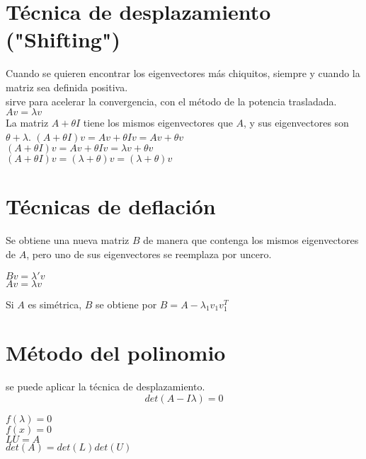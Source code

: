 \section{T\'ecnica de desplazamiento ("Shifting")}
Cuando se quieren encontrar los eigenvectores m\'as chiquitos, siempre y cuando la matriz sea definida positiva.\\
sirve para acelerar la convergencia, con el m\'etodo de la potencia trasladada.\\ 
$Av=\lambda v$\\
La matriz $A+\theta I$ tiene los mismos eigenvectores que $A$, y sus eigenvectores son $\theta +\lambda$.
$(A+\theta I)v=Av+\theta Iv=Av+\theta v$
\\
$(A+\theta I)v=Av+\theta Iv=\lambda v+\theta v$\\
$(A+\theta I)v=(\lambda+\theta)v=(\lambda+\theta)v$
\section{T\'ecnicas de deflaci\'on}
Se obtiene una nueva matriz $B$ de manera que contenga los mismos eigenvectores de $A$, pero uno de sus eigenvectores se reemplaza por uncero.
\begin{center}
$Bv=\lambda 'v$\\
$Av=\lambda v$
\end{center}
Si $A$ es sim\'etrica, $B$ se obtiene por $B=A-\lambda_1v_1v_1^T$
 
\section{M\'etodo del polinomio}
se puede aplicar la t\'ecnica de desplazamiento.
\begin{displaymath}
det(A-I\lambda)=0
\end{displaymath} 
\begin{center}
$f(\lambda)=0$\\
$f(x)=0$\\
$LU=A$\\
$det(A)=det(L)det(U)$
\end{center}